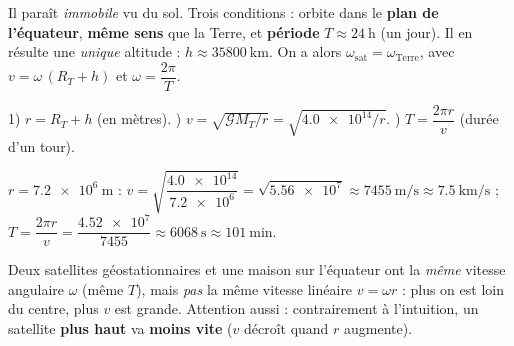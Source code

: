 \documentclass[11pt,a4paper]{article}
\begin{document}
\begin{cle}
Il paraît \emph{immobile} vu du sol. Trois conditions : orbite dans le \textbf{plan de
l'équateur}, \textbf{même sens} que la Terre, et \textbf{période} $T\approx\qty{24}{\hour}$
(un jour). Il en résulte une \emph{unique} altitude : $h\approx\qty{35800}{\kilo\metre}$.
On a alors $\omega_{\text{sat}}=\omega_{\text{Terre}}$, avec
$v=\omega\,(R_T+h)$ et $\omega=\dfrac{2\pi}{T}$.
\end{cle}

\begin{methode}
1) $r=R_T+h$ (en mètres). ) $v=\sqrt{\mathcal{G}M_T/r}=\sqrt{\num{4.0e14}/r}$.
) $T=\dfrac{2\pi r}{v}$ (durée d'un tour).
\end{methode}

\begin{exemplebox}[orbite basse à $h=\qty{800}{\kilo\metre}$]
$r=\qty{7.2e6}{\metre}$ : \;
$v=\sqrt{\dfrac{\num{4.0e14}}{\num{7.2e6}}}=\sqrt{\num{5.56e7}}\approx\qty{7455}{\metre\per\second}
\approx\qty{7.5}{\kilo\metre\per\second}$ ; \;
$T=\dfrac{2\pi r}{v}=\dfrac{\num{4.52e7}}{7455}\approx\qty{6068}{\second}\approx\qty{101}{\minute}$.
\end{exemplebox}

\begin{piege}[« même $\omega$ » n'est pas « même $v$ » ; « plus haut » = « plus lent »]
Deux satellites géostationnaires et une maison sur l'équateur ont la \emph{même}
vitesse angulaire $\omega$ (même $T$), mais \emph{pas} la même vitesse linéaire
$v=\omega r$ : plus on est loin du centre, plus $v$ est grande. Attention aussi :
contrairement à l'intuition, un satellite \textbf{plus haut} va \textbf{moins vite}
($v$ décroît quand $r$ augmente).
\end{piege}
\end{document}
